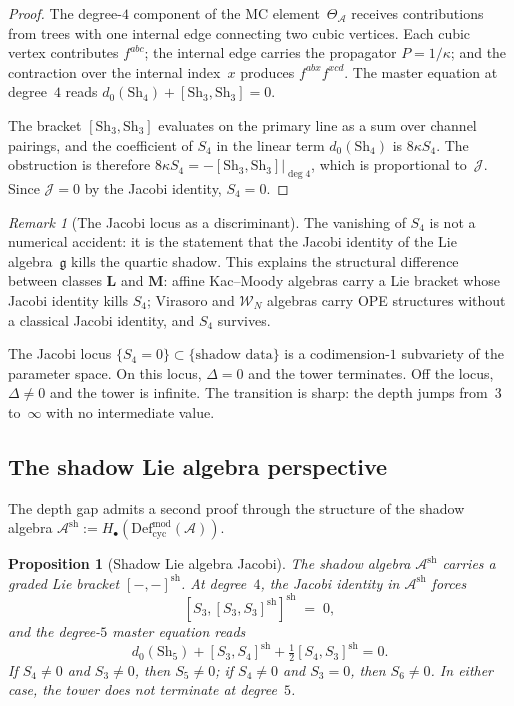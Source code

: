 \documentclass[11pt,reqno]{amsart}
\newtheorem{proposition}[theorem]{Proposition}
\theoremstyle{definition}
\theoremstyle{remark}
\newtheorem{remark}[theorem]{Remark}
\newcommand{\cA}{\mathcal{A}}
\newcommand{\cW}{\mathcal{W}}
\newcommand{\Defcyc}{\mathrm{Def}_{\mathrm{cyc}}}
\newcommand{\Sh}{\mathrm{Sh}}
\newcommand{\fg}{\mathfrak{g}}
\numberwithin{equation}{section}
\begin{document}
\begin{proof}
The degree-$4$ component of the MC element~$\Theta_\cA$
receives contributions from trees with one internal edge
connecting two cubic vertices. Each cubic vertex contributes
$f^{abc}$; the internal edge carries the propagator
$P = 1/\kappa$; and the contraction over the internal
index~$x$ produces $f^{abx} f^{xcd}$. The master equation
at degree~$4$ reads
$d_0(\Sh_4) + [\Sh_3, \Sh_3] = 0$.

The bracket $[\Sh_3, \Sh_3]$ evaluates on the primary line as
a sum over channel pairings, and the coefficient of $S_4$
in the linear term $d_0(\Sh_4)$ is $8\kappa S_4$. The
obstruction is therefore
$8\kappa S_4 = -[\Sh_3, \Sh_3]|_{\deg 4}$, which is
proportional to~$\mathcal{J}$. Since $\mathcal{J} = 0$ by
the Jacobi identity, $S_4 = 0$.
\end{proof}

\begin{remark}[The Jacobi locus as a
discriminant]\label{rem:jacobi-locus}
The vanishing of $S_4$ is not a numerical accident: it is
the statement that the Jacobi identity of the Lie
algebra~$\fg$ kills the quartic shadow. This explains the
structural difference between classes $\mathbf{L}$ and
$\mathbf{M}$: affine Kac--Moody algebras carry a Lie
bracket whose Jacobi identity kills $S_4$; Virasoro and
$\cW_N$ algebras carry OPE structures without a classical
Jacobi identity, and $S_4$ survives.

The Jacobi locus
$\{S_4 = 0\} \subset \{\text{shadow data}\}$ is a
codimension-$1$ subvariety of the parameter space. On this
locus, $\Delta = 0$ and the tower terminates. Off the
locus, $\Delta \ne 0$ and the tower is infinite. The
transition is sharp: the depth jumps from~$3$ to~$\infty$
with no intermediate value.
\end{remark}

\subsection{The shadow Lie algebra
perspective}\label{subsec:shadow-lie}

The depth gap admits a second proof through the structure of
the shadow algebra
$\cA^{\mathrm{sh}} := H_\bullet(
\Defcyc^{\mathrm{mod}}(\cA))$.

\begin{proposition}[Shadow Lie algebra
Jacobi]\label{prop:shadow-lie-jacobi}
The shadow algebra $\cA^{\mathrm{sh}}$ carries a graded Lie
bracket $[-,-]^{\mathrm{sh}}$. At degree~$4$, the Jacobi
identity in $\cA^{\mathrm{sh}}$ forces
\[
 [S_3, [S_3, S_3]^{\mathrm{sh}}]^{\mathrm{sh}}
 \;=\;
 0,
\]
and the degree-$5$ master equation reads
\[
 d_0(\Sh_5) + [S_3, S_4]^{\mathrm{sh}}
 + \tfrac{1}{2}[S_4, S_3]^{\mathrm{sh}} = 0.
\]
If $S_4 \ne 0$ and $S_3 \ne 0$, then $S_5 \ne 0$; if
$S_4 \ne 0$ and $S_3 = 0$, then $S_6 \ne 0$. In either
case, the tower does not terminate at degree~$5$.
\end{proposition}
\end{document}
